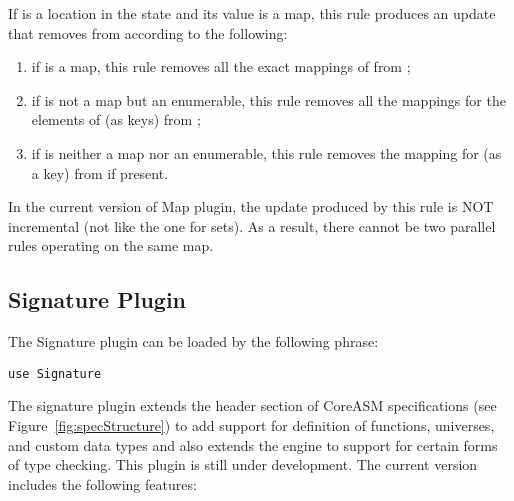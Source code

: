 \documentclass{article}
\newcommand{\CoreASM}{{\sffamily CoreASM}\xspace}
\begin{document}
If  is a location in the state and its value is a map, this rule produces an 
update that removes  from  according to the following:
\begin{enumerate}
	\item if  is a map, this rule removes all the exact mappings 
		of  from ;
	\item if  is not a map but an enumerable, this rule removes all the 
		mappings for the elements of  (as keys) from ;
	\item if  is neither a map nor an enumerable, this rule removes the mapping
		for  (as a key) from  if present.
\end{enumerate} 
In the current version of Map plugin, the update produced
by this rule is NOT incremental (not like the one for sets). As a result, there cannot be two parallel 
 rules operating on the same map. 

\subsection{Signature Plugin}
\label{signature}

The Signature plugin can be loaded by the following  phrase:

\begin{lstlisting}
use Signature
\end{lstlisting}

\noindent The signature plugin extends the header section of \CoreASM
specifications (see Figure~\ref{fig:specStructure}) to add support for definition of functions, universes, and custom data types and also extends the engine to support for certain forms of type checking. This plugin is still under development. The current version includes the following features:
\end{document}
